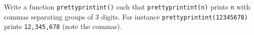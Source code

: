 Write a function \texttt{prettyprintint()} such that \texttt{prettyprintint(n)} prints \texttt{n} with commas separating groups of 3 digits. For instance \texttt{prettyprintint(12345678)} prints \texttt{12,345,678} (note the commas).

